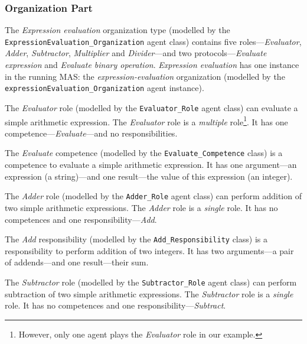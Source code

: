 \subsubsection*{Organization Part}

The \textit{Expression evaluation} organization type (modelled by the \texttt{ExpressionEvaluation\_Organization} agent class) contains five roles---\textit{Evaluator}, \textit{Adder}, \textit{Subtractor}, \textit{Multiplier} and \textit{Divider}---and two protocols---\textit{Evaluate expression} and \textit{Evaluate binary operation}.
\textit{Expression evaluation} has one instance in the running MAS: the \textit{expression-evaluation} organization (modelled by the \texttt{expressionEvaluation\_Organization} agent instance).

The \textit{Evaluator} role (modelled by the \texttt{Evaluator\_Role} agent class) can evaluate a simple arithmetic expression.
The \textit{Evaluator} role is a \textit{multiple} role\footnote{However, only one agent plays the \textit{Evaluator} role in our example.}.
It has one competence---\textit{Evaluate}---and no responsibilities.

The \textit{Evaluate} competence (modelled by the \texttt{Evaluate\_Competence} class) is a competence to evaluate a simple arithmetic expression.
It has one argument---an expression (a string)---and one result---the value of this expression (an integer).

The \textit{Adder} role (modelled by the \texttt{Adder\_Role} agent class) can perform addition of two simple arithmetic expressions.
The \textit{Adder} role is a \textit{single} role.
It has no competences and one responsibility---\textit{Add}.

The \textit{Add} responsibility (modelled by the \texttt{Add\_Responsibility} class) is a responsibility to perform addition of two integers.
It has two arguments---a pair of addends---and one result---their sum.

The \textit{Subtractor} role (modelled by the \texttt{Subtractor\_Role} agent class) can perform subtraction of two simple arithmetic expressions.
The \textit{Subtractor} role is a \textit{single} role.
It has no competences and one responsibility---\textit{Subtract}.

